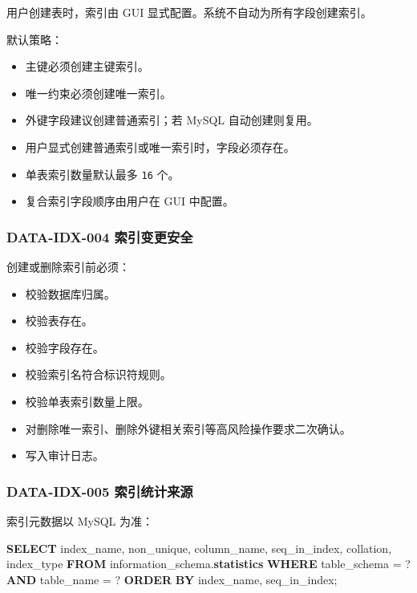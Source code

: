\documentclass[
  a4paper,
  UTF8]{ctexart}
\newenvironment{Shaded}{}{}
\newcommand{\KeywordTok}[1]{\textcolor[rgb]{0.00,0.44,0.13}{\textbf{#1}}}
\newcommand{\NormalTok}[1]{#1}
\newcommand{\OperatorTok}[1]{\textcolor[rgb]{0.40,0.40,0.40}{#1}}
\providecommand{\tightlist}{%
  \setlength{\itemsep}{0pt}\setlength{\parskip}{0pt}}
\begin{document}
用户创建表时，索引由 GUI 显式配置。系统不自动为所有字段创建索引。

默认策略：

\begin{itemize}
\tightlist
\item
  主键必须创建主键索引。
\item
  唯一约束必须创建唯一索引。
\item
  外键字段建议创建普通索引；若 MySQL 自动创建则复用。
\item
  用户显式创建普通索引或唯一索引时，字段必须存在。
\item
  单表索引数量默认最多 \texttt{16} 个。
\item
  复合索引字段顺序由用户在 GUI 中配置。
\end{itemize}

\hypertarget{data-idx-004-ux7d22ux5f15ux53d8ux66f4ux5b89ux5168}{%
\subsubsection{DATA-IDX-004
索引变更安全}\label{data-idx-004-ux7d22ux5f15ux53d8ux66f4ux5b89ux5168}}

创建或删除索引前必须：

\begin{itemize}
\tightlist
\item
  校验数据库归属。
\item
  校验表存在。
\item
  校验字段存在。
\item
  校验索引名符合标识符规则。
\item
  校验单表索引数量上限。
\item
  对删除唯一索引、删除外键相关索引等高风险操作要求二次确认。
\item
  写入审计日志。
\end{itemize}

\hypertarget{data-idx-005-ux7d22ux5f15ux7edfux8ba1ux6765ux6e90}{%
\subsubsection{DATA-IDX-005
索引统计来源}\label{data-idx-005-ux7d22ux5f15ux7edfux8ba1ux6765ux6e90}}

索引元数据以 MySQL 为准：

\begin{Shaded}
\begin{Highlighting}[]
\KeywordTok{SELECT}
\NormalTok{  index\_name,}
\NormalTok{  non\_unique,}
\NormalTok{  column\_name,}
\NormalTok{  seq\_in\_index,}
\NormalTok{  collation,}
\NormalTok{  index\_type}
\KeywordTok{FROM}\NormalTok{ information\_schema.}\KeywordTok{statistics}
\KeywordTok{WHERE}\NormalTok{ table\_schema }\OperatorTok{=}\NormalTok{ ?}
  \KeywordTok{AND}\NormalTok{ table\_name }\OperatorTok{=}\NormalTok{ ?}
\KeywordTok{ORDER} \KeywordTok{BY}\NormalTok{ index\_name, seq\_in\_index;}
\end{Highlighting}
\end{Shaded}
\end{document}
